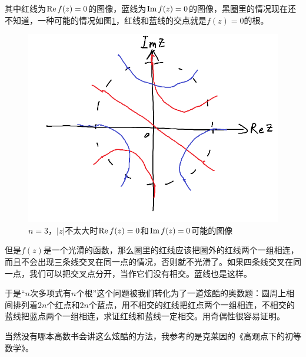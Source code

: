其中红线为$\mathrm{Re}\mathop{}\! f(z)=0$的图像，蓝线为$\mathrm{Im}\mathop{}\! f(z)=0$的图像，黑圈里的情况现在还不知道，一种可能的情况如图\ref{fig-poly-root-inner}，红线和蓝线的交点就是$f(z)=0$的根。
\begin{figure}[htb]
\centering
\includegraphics[scale=0.5]{fig/poly-root-inner.png}
\caption{$n=3$，$|z|$不太大时$\mathrm{Re}\mathop{}\! f(z)=0$和$\mathrm{Im}\mathop{}\! f(z)=0$可能的图像}
\label{fig-poly-root-inner}
\end{figure}

但是$f(z)$是一个光滑的函数，那么圈里的红线应该把圈外的红线两个一组相连，而且不会出现三条线交叉在同一点的情况，否则就不光滑了。如果四条线交叉在同一点，我们可以把交叉点分开，当作它们没有相交。蓝线也是这样。

于是“$n$次多项式有$n$个根”这个问题被我们转化为了一道炫酷的奥数题：圆周上相间排列着$2n$个红点和$2n$个蓝点，用不相交的红线把红点两个一组相连，不相交的蓝线把蓝点两个一组相连，求证红线和蓝线一定相交。用奇偶性很容易证明。

当然没有哪本高数书会讲这么炫酷的方法，我参考的是克莱因的《高观点下的初等数学》。
